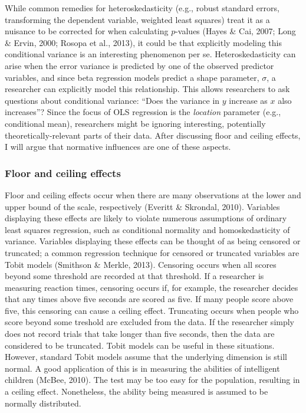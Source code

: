 \documentclass[english,man]{apa6}
\theoremstyle{definition}
\theoremstyle{definition}
\theoremstyle{remark}
\begin{document}
While common remedies for heteroskedasticity (e.g., robust standard
errors, transforming the dependent variable, weighted least squares)
treat it as a nuisance to be corrected for when calculating \(p\)-values
(Hayes \& Cai, 2007; Long \& Ervin, 2000; Rosopa et al., 2013), it could
be that explicitly modeling this conditional variance is an interesting
phenomenon per se. Heteroskedasticity can arise when the error variance
is predicted by one of the observed predictor variables, and since beta
regression models predict a shape parameter, \(\sigma\), a researcher
can explicitly model this relationship. This allows researchers to ask
questions about conditional variance: \enquote{Does the variance in
\(y\) increase as \(x\) also increases}? Since the focus of OLS
regression is the \emph{location} parameter (e.g., conditional mean),
researchers might be ignoring interesting, potentially
theoretically-relevant parts of their data. After discussing floor and
ceiling effects, I will argue that normative influences are one of these
aspects.

\subsubsection{Floor and ceiling
effects}\label{floor-and-ceiling-effects}

Floor and ceiling effects occur when there are many observations at the
lower and upper bound of the scale, respectively (Everitt \& Skrondal,
2010). Variables displaying these effects are likely to violate numerous
assumptions of ordinary least squares regression, such as conditional
normality and homoskedasticity of variance. Variables displaying these
effects can be thought of as being censored or truncated; a common
regression technique for censored or truncated variables are Tobit
models (Smithson \& Merkle, 2013). Censoring occurs when all scores
beyond some threshold are recorded at that threshold. If a researcher is
measuring reaction times, censoring occurs if, for example, the
researcher decides that any times above five seconds are scored as five.
If many people score above five, this censoring can cause a ceiling
effect. Truncating occurs when people who score beyond some treshold are
excluded from the data. If the researcher simply does not record trials
that take longer than five seconds, then the data are considered to be
truncated. Tobit models can be useful in these situations. However,
standard Tobit models assume that the underlying dimension is still
normal. A good application of this is in measuring the abilities of
intelligent children (McBee, 2010). The test may be too easy for the
population, resulting in a ceiling effect. Nonetheless, the ability
being measured is assumed to be normally distributed.
\end{document}
